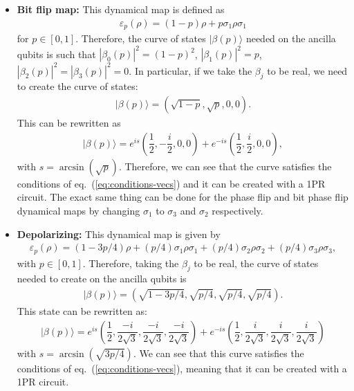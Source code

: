 \documentclass[10pt,letterpaper]{article} %
\newcommand{\eref}[1]{eq.~(\ref{#1})}
\begin{document}
\begin{itemize}
\item \textbf{Bit flip map:} 
This dynamical map is defined as
\begin{align*}
\varepsilon_p(\rho) = (1-p)\rho + p\sigma_1 \rho \sigma_1
\end{align*}
for $p \in [0,1]$. 
Therefore, the curve of states $|\beta(p)\rangle$ needed on the ancilla
qubits is such that 
$|\beta_0(p)|^2= (1-p)^2$, $|\beta_1(p)|^2 = p$, $|\beta_2(p)|^2 = |\beta_3(p)|^2 = 0$.
In particular, if we take the $\beta_j$ to be real,
we need to create the curve of states:
\begin{align*}
|\beta(p)\rangle = \left(\sqrt{1-p},\sqrt{p},0,0\right).
\end{align*}
This can be rewritten as
\begin{align*}
|\beta(p) \rangle = e^{is} \left( \dfrac{1}{2}, - \dfrac{i}{2},0,0 \right) + e^{-is} \left( \dfrac{1}{2}, \dfrac{i}{2},0,0 \right),
\end{align*}
with $s= \arcsin(\sqrt{p})$.
Therefore, we can see that the curve satisfies the conditions of  \eref{eq:conditions-vecs} 
and it can be created with a 1PR circuit.
The exact same thing can be done
for the phase flip and bit phase flip dynamical maps by
changing $\sigma_1$ to
$\sigma_3$ and $\sigma_2$ respectively.

\item \textbf{Depolarizing:} This dynamical map is given by
\begin{align*}
\varepsilon_p(\rho) = (1-3p/4) \rho + (p/4) \sigma_1 \rho \sigma_1 + (p/4) \sigma_2 \rho \sigma_2 + (p/4) \sigma_3 \rho \sigma_3,
\end{align*}
with $p \in [0,1]$. 
Therefore, taking the $\beta_j$ to be real,
the curve of states needed to create on the ancilla qubits is
\begin{align*}
|\beta(p) \rangle = \left( \sqrt{1-3p/4}, \sqrt{p/4}, \sqrt{p/4},\sqrt{p/4} \right).
\end{align*}
This state can be rewritten as:
\begin{align*}
|\beta(p)\rangle = e^{is} \left( \dfrac{1}{2}, \dfrac{-i}{2\sqrt{3}},\dfrac{-i}{2\sqrt{3}},\dfrac{-i}{2\sqrt{3}} \right) + e^{-is} \left( \dfrac{1}{2}, \dfrac{i}{2\sqrt{3}},\dfrac{i}{2\sqrt{3}},\dfrac{i}{2\sqrt{3}}\right)
\end{align*}
with $s = \arcsin(\sqrt{3p/4})$.
We can see that this curve satisfies the conditions of \eref{eq:conditions-vecs}, meaning that it can be created with a 
1PR circuit.


\end{itemize}
\end{document}
